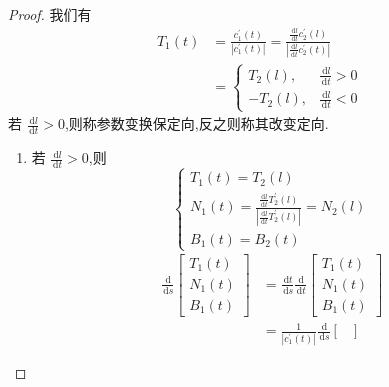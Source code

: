 \documentclass[../../古典微分几何.tex]{subfiles}
\begin{document}
\begin{proof}
我们有 \[
\begin{aligned}
T_1\left( t \right)  & =  \frac{c_1^{\prime} \left( t \right)  }{ \left| c_1^{\prime} \left( t \right)  \right|  } =  \frac{\frac{\,\mathrm{d} l }{\,\mathrm{d} t } c_2^{\prime} \left( l \right)   }{\left| \frac{\,\mathrm{d} l }{\,\mathrm{d} t } c_2^{\prime} \left( t \right)   \right|  }\\ 
 & =  \begin{cases} T_2\left( l \right),& \frac{\,\mathrm{d} l }{\,\mathrm{d} t }>0\\ 
  -T_2\left( l \right),& \frac{\,\mathrm{d} l }{\,\mathrm{d} t }<0     \end{cases}  
\end{aligned}
\]若 \(  \frac{\,\mathrm{d} l }{\,\mathrm{d} t }>0   \),则称参数变换保定向,反之则称其改变定向. 
    \begin{enumerate}
        \item 若 \(  \frac{\,\mathrm{d} l }{\,\mathrm{d} t }>0   \),则 \[
        \begin{cases} T_1\left( t \right)= T_2\left( l \right)\\ 
         N_1\left( t \right)=  \frac{ \frac{\,\mathrm{d} l }{\,\mathrm{d} t } T_2^{\prime} \left( l \right)   }{ \left|  \frac{\,\mathrm{d} l }{\,\mathrm{d} t } T_2^{\prime} \left( l \right)   \right|  }= N_2\left( l \right)      \\ 
          B_1\left( t \right) = B_2\left( t \right) \end{cases} 
        \]  \[
        \begin{aligned}
        \frac{\,\mathrm{d}  }{\,\mathrm{d} s }\begin{bmatrix} 
            T_1\left( t \right)\\ 
             N_1\left( t \right)   \\ 
              B_1\left( t \right) 
        \end{bmatrix} & =  \frac{\,\mathrm{d} t }{\,\mathrm{d} s }\frac{\,\mathrm{d}  }{\,\mathrm{d} t }\begin{bmatrix} 
             T_1\left( t \right)\\ 
              N_1\left( t \right)\\ 
               B_1\left( t \right)    
        \end{bmatrix}\\ 
         & =  \frac{1 }{\left| c_1^{\prime} \left( t \right)  \right|  } \frac{\,\mathrm{d}  }{\,\mathrm{d} s }\begin{bmatrix} 

\end{bmatrix}
\end{aligned}\]
\end{enumerate}
\end{proof}
\end{document}
